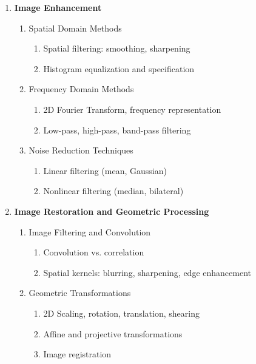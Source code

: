 \documentclass[a4paper,10pt]{article}
\begin{document}
\begin{enumerate}[label=\Roman*.]
    \item \textbf{Image Enhancement}
    \begin{enumerate}[label=\alph*.]
        \item Spatial Domain Methods
        \begin{enumerate}[label=\roman*.]
            \item Spatial filtering: smoothing, sharpening
            \item Histogram equalization and specification
        \end{enumerate}
        \item Frequency Domain Methods
        \begin{enumerate}[label=\roman*.]
            \item 2D Fourier Transform, frequency representation
            \item Low-pass, high-pass, band-pass filtering
        \end{enumerate}
        \item Noise Reduction Techniques
        \begin{enumerate}[label=\roman*.]
            \item Linear filtering (mean, Gaussian)
            \item Nonlinear filtering (median, bilateral)
        \end{enumerate}
    \end{enumerate}

    \item \textbf{Image Restoration and Geometric Processing}
    \begin{enumerate}[label=\alph*.]
        \item Image Filtering and Convolution
        \begin{enumerate}[label=\roman*.]
            \item Convolution vs. correlation
            \item Spatial kernels: blurring, sharpening, edge enhancement
        \end{enumerate}
        \item Geometric Transformations
        \begin{enumerate}[label=\roman*.]
            \item 2D Scaling, rotation, translation, shearing
            \item Affine and projective transformations
            \item Image registration
        \end{enumerate}
    \end{enumerate}


\end{enumerate}
\end{document}

